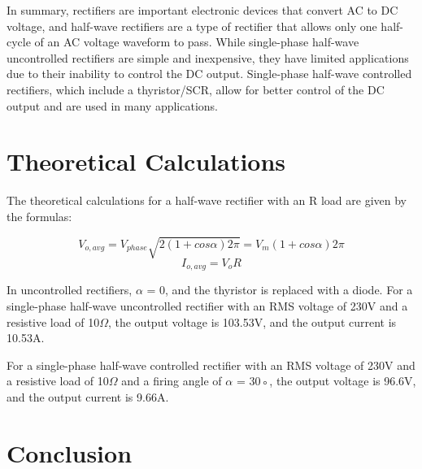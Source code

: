 In summary, rectifiers are important electronic devices that convert AC to DC voltage, and half-wave rectifiers are a type of rectifier that allows only one half-cycle of an AC voltage waveform to pass. While single-phase half-wave uncontrolled rectifiers are simple and inexpensive, they have limited applications due to their inability to control the DC output. Single-phase half-wave controlled rectifiers, which include a thyristor/SCR, allow for better control of the DC output and are used in many applications.



\section{Theoretical Calculations}
\hspace{\parindent}
The theoretical calculations for a half-wave rectifier with an R load are given by the formulas:


$$
    V_{o,avg} =
    V_{phase}
    \sqrt{2(1 + cos\alpha)2\pi} =
    V_m(1 + cos\alpha)
    2\pi
$$
$$
    I_{o,avg} =
    V_oR
$$

In uncontrolled rectifiers, $ \alpha$ = 0, and the thyristor is replaced with a diode.
For a single-phase half-wave uncontrolled rectifier with an RMS voltage of 230V
and a resistive load of 10$ \Omega $,
the output voltage is 103.53V, and the output current is 10.53A.

For a single-phase half-wave controlled rectifier with an RMS voltage of 230V
and a resistive load of 10$ \Omega $ and a firing angle of $ \alpha  $ = 30◦, the output voltage
is 96.6V, and the output current is 9.66A.

\pagebreak











\section{Conclusion}


\hspace{\parindent}

